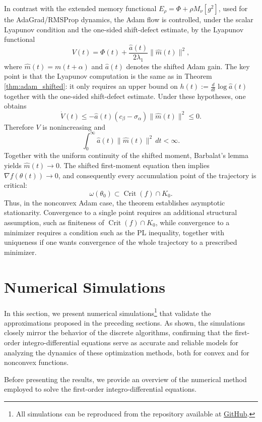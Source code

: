\documentclass{article} %
\begin{document}
In contrast with the extended memory functional \(E_\rho=\Phi+\rho M_\nu[g^2]\), used for the AdaGrad/RMSProp dynamics, the Adam flow is controlled, under the scalar Lyapunov condition and the one-sided shift-defect estimate, by the Lyapunov functional
\[
V(t)=\Phi(t)+\frac{\widehat a(t)}{2\lambda_1}\|\widehat m(t)\|^2,
\]
where \(\widehat m(t)=m(t+\alpha)\) and \(\widehat a(t)\) denotes the shifted Adam gain. The key point is that the Lyapunov computation is the same as in Theorem \ref{thm:adam_shifted}: it only requires an upper bound on $h(t):=\frac{d}{dt}\log \widehat a(t)$
together with the one-sided shift-defect estimate. Under these hypotheses, one obtains
\[
\dot V(t)\le -\widehat a(t)(c_\beta-\sigma_\alpha)\|\widehat m(t)\|^2\le0.
\]
Therefore \(V\) is nonincreasing and
\[
\int_0^\infty \widehat a(t)\|\widehat m(t)\|^2\,dt<\infty.
\]
Together with the uniform continuity of the shifted moment, Barbalat's lemma yields \(\widehat m(t)\to0\). The shifted first-moment equation then implies \(\nabla f(\theta(t))\to0\), and consequently every accumulation point of the trajectory is critical:
\[
\omega(\theta_0)\subset \operatorname{Crit}(f)\cap K_0.
\]
Thus, in the nonconvex Adam case, the theorem establishes asymptotic stationarity. Convergence to a single point requires an additional structural assumption, such as finiteness of \(\operatorname{Crit}(f)\cap K_0\), while convergence to a minimizer requires a condition such as the PL inequality, together with uniqueness if one wants convergence of the whole trajectory to a prescribed minimizer.

\section{Numerical Simulations}

In this section, we present numerical simulations\footnote{All simulations can be reproduced from the repository available at \href{https://github.com/carlosherediapimienta/numerical_simulations_nonlocal}{GitHub}.} that validate the approximations proposed in the preceding sections. As shown, the simulations closely mirror the behavior of the discrete algorithms, confirming that the first-order integro-differential equations serve as accurate and reliable models for analyzing the dynamics of these optimization methods, both for convex and for nonconvex functions. 

Before presenting the results, we provide an overview of the numerical method employed to solve the first-order integro-differential equations.
\end{document}
